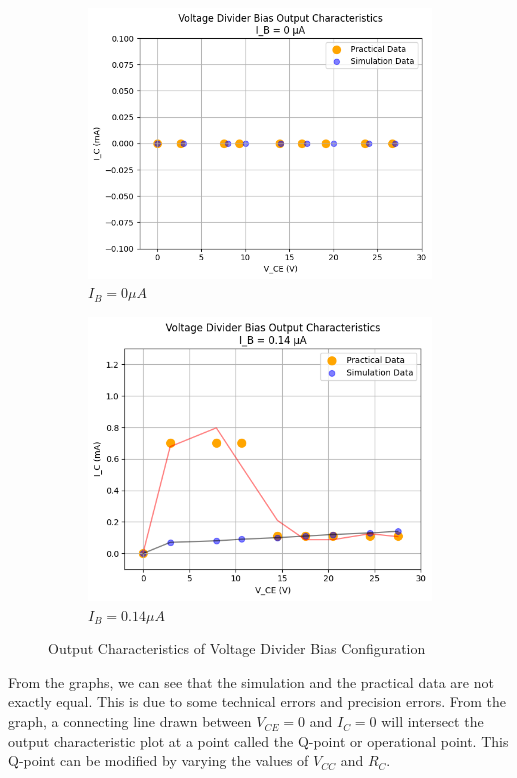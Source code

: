 \documentclass[12pt]{article}
\begin{document}
\begin{figure}[h!]
    \centering
    \begin{subfigure}{0.49\textwidth}
        \includegraphics[width=0.9\linewidth]{VD_0A.png}
        \caption{$I_B = 0\mu A$}
    \end{subfigure}
    \begin{subfigure}{0.49\textwidth}
        \includegraphics[width=0.9\linewidth]{VD_0.14A.png}
        \caption{$I_B = 0.14\mu A$}
    \end{subfigure}
    \caption{Output Characteristics of Voltage Divider Bias Configuration}
    \label{Voltage Divider Bias Graph}
\end{figure}

From the graphs, we can see that the simulation and the practical data are not exactly equal. This is due to some technical errors and precision errors. From the graph, a connecting line drawn between $V_{CE} = 0$ and $I_C = 0$ will intersect the output characteristic plot at a point called the Q-point or operational point. This Q-point can be modified by varying the values of $V_{CC}$ and $R_C$.
\end{document}
